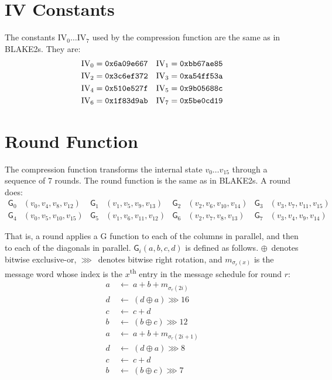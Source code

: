 \documentclass[12pt,notitlepage,a4paper]{article}
\newcommand{\GG}{\mathsf{G}}
\newcommand{\IV}{\text{IV}}
\begin{document}
\begin{appendices}

\section{IV Constants}\label{sec:ivconstants}

    The constants $\IV_0 \ldots \IV_7$ used by the compression function are the
    same as in BLAKE2s. They are:
\begin{align*}
    \IV_0 &= \text{\texttt{0x6a09e667}} &
    \IV_1 &= \text{\texttt{0xbb67ae85}} \\
    \IV_2 &= \text{\texttt{0x3c6ef372}} &
    \IV_3 &= \text{\texttt{0xa54ff53a}} \\
    \IV_4 &= \text{\texttt{0x510e527f}} &
    \IV_5 &= \text{\texttt{0x9b05688c}} \\
    \IV_6 &= \text{\texttt{0x1f83d9ab}} &
    \IV_7 &= \text{\texttt{0x5be0cd19}}
\end{align*}

\section{Round Function}\label{sec:roundfn}

    The compression function transforms the internal state $v_{0} \ldots
    v_{15}$ through a sequence of 7 rounds. The round function is the same as
    in BLAKE2s. A round does:
\begin{align*}
    \GG_{0}&(v_{0}, v_{4}, v_{8}, v_{12}) &
    \GG_{1}&(v_{1}, v_{5}, v_{9}, v_{13}) &
    \GG_{2}&(v_{2}, v_{6}, v_{10}, v_{14}) &
    \GG_{3}&(v_{3}, v_{7}, v_{11}, v_{15}) \\
    \GG_{4}&(v_{0}, v_{5}, v_{10}, v_{15}) &
    \GG_{5}&(v_{1}, v_{6}, v_{11}, v_{12}) &
    \GG_{6}&(v_{2}, v_{7}, v_{8}, v_{13}) &
    \GG_{7}&(v_{3}, v_{4}, v_{9}, v_{14})
\end{align*}

    That is, a round applies a G function to each of the columns in parallel,
    and then to each of the diagonals in parallel. $\GG_i(a, b, c, d)$ is
    defined as follows. $\oplus$~denotes bitwise exclusive-or, $\ggg$~denotes
    bitwise right rotation, and $m_{\sigma_r(x)}$ is the message word whose
    index is the $x$\textsuperscript{th} entry in the message schedule for
    round $r$:
\begin{align*}
    a \ & \leftarrow \ a + b + m_{\sigma_r(2i)} \\
    d \ & \leftarrow \ (d \oplus a) \ggg 16 \\
    c \ & \leftarrow \ c + d \\
    b \ & \leftarrow \ (b \oplus c) \ggg 12 \\
    a \ & \leftarrow \ a + b + m_{\sigma_r(2i+1)} \\
    d \ & \leftarrow \ (d \oplus a) \ggg 8 \\
    c \ & \leftarrow \ c + d \\
    b \ & \leftarrow \ (b \oplus c) \ggg 7
\end{align*}


\end{appendices}
\end{document}
